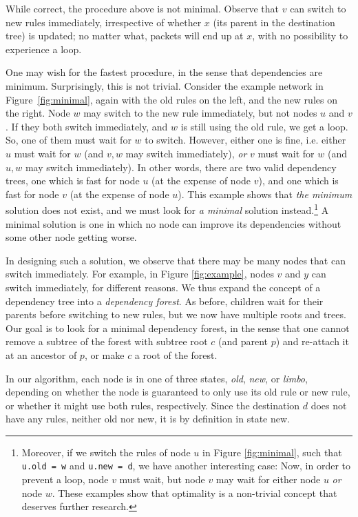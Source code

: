 While correct, the procedure above is not minimal. Observe that $v$ can switch to new rules immediately, irrespective of whether $x$ (its parent in the destination tree) is updated; no matter what, packets will end up at $x$, with no possibility to experience a loop.

One may wish for the fastest procedure, in the sense that dependencies are minimum. Surprisingly, this is not trivial. Consider the example network in Figure~\ref{fig:minimal}, again with the old rules on the left, and the new rules on the right. Node $w$ may switch to the new rule immediately, but not nodes $u$ and $v$. If they both switch immediately, and $w$ is still using the old rule, we get a loop. So, one of them must wait for $w$ to switch. However, either one is fine, i.e. either $u$ must wait for $w$ (and $v,w$ may switch immediately), \emph{or} $v$ must wait for $w$ (and $u,w$ may switch immediately). In other words, there are two valid dependency trees, one which is fast for node $u$ (at the expense of node $v$), and one which is fast for node $v$ (at the expense of node $u$).
This example shows that \emph{the minimum} solution does not exist, and we must look for \emph{a minimal} solution instead.\footnote{Moreover, if we switch the rules of node $u$ in Figure \ref{fig:minimal}, such that \texttt{u.old = w} and \texttt{u.new = d}, we have another interesting case: Now, in order to prevent a loop, node $v$ must wait, but node $v$ may wait for either node $u$ \emph{or} node $w$. These examples show that optimality is a non-trivial concept that deserves further research.}  A minimal solution is one in which no node can improve its dependencies without some other node getting worse.

In designing such a solution, we observe that there may be many nodes that can switch immediately. For example, in Figure \ref{fig:example}, nodes $v$ and $y$ can switch immediately, for different reasons. We thus expand the concept of a dependency tree into a \emph{dependency forest}. As before, children wait for their parents before switching to new rules, but we now have multiple roots and trees. Our goal is to look for a minimal dependency forest, in the sense that one cannot remove a subtree of the forest with subtree root $c$ (and parent $p$) and re-attach it at an ancestor of $p$, or make $c$ a root of the forest.

In our algorithm, each node is in one of three states, \emph{old}, \emph{new}, or \emph{limbo}, depending on whether the node is guaranteed to only use its old rule or new rule, or whether it might use both rules, respectively. Since the destination $d$ does not have any rules, neither old nor new, it is by definition in state new.


